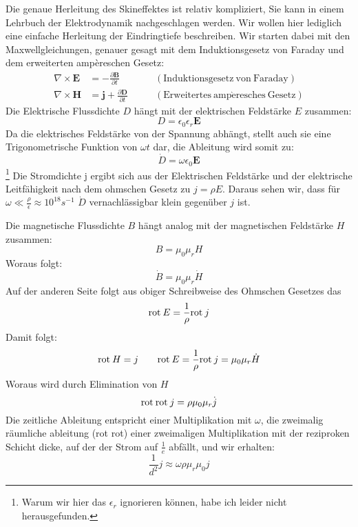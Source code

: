 Die genaue Herleitung des Skineffektes ist relativ kompliziert, Sie kann in einem Lehrbuch der Elektrodynamik nachgeschlagen werden. %
Wir wollen hier lediglich eine einfache Herleitung der Eindringtiefe beschreiben.
Wir starten dabei mit den Maxwellgleichungen, genauer gesagt mit dem Induktionsgesetz von Faraday und dem erweiterten ampèreschen Gesetz:
\begin{align}
\nabla \times \mathbf{E} &= -\frac{\partial \mathbf{B}}{\partial t} \qquad &\mathrm{(Induktionsgesetz\ von\ Faraday)} \\
\nabla \times \mathbf{H} &= \mathbf{j} + \frac{\partial \mathbf{D}}{\partial t} \qquad &\mathrm{(Erweitertes\ amp\grave{e}resches\ Gesetz)}
\end{align}
Die Elektrische Flussdichte $D$ hängt mit der elektrischen Feldstärke $E$ zusammen:
\begin{equation}
D = \epsilon_0 \epsilon_r \textbf{E}
\end{equation}
Da die elektrisches Feldstärke von der Spannung abhängt, stellt auch sie eine Trigonometrische Funktion von $\omega t$ dar, die Ableitung wird somit zu:
\begin{equation}
\dot{D} = \omega \epsilon_0 \textbf{E}
\end{equation}\footnote{Warum wir hier das $\epsilon_r$ ignorieren können, habe ich leider nicht herausgefunden.}
Die Stromdichte j ergibt sich aus der Elektrischen Feldstärke und der elektrische Leitfähigkeit nach dem ohmschen Gesetz zu $j = \rho E$. Daraus sehen wir, dass für $\omega \ll \frac{\rho}{\epsilon} \approx 10^18 s^{-1}$ $\dot D$ vernachlässigbar klein gegenüber $j$ ist.

Die magnetische Flussdichte $B$ hängt analog mit der magnetischen Feldstärke $H$ zusammen:
\begin{equation}
B = \mu_0 \mu_r H
\end{equation} 
Woraus folgt:
\begin{equation}
\dot{B} = \mu_0 \mu_r \dot{H}
\end{equation} 
Auf der anderen Seite folgt aus obiger Schreibweise des Ohmschen Gesetzes das 
\begin{equation}
\mathrm{rot\:} E = \frac{1}{\rho} \mathrm{rot\:} j
\end{equation}
Damit folgt:
\begin{equation}
\mathrm{rot\:} H = j \qquad
\mathrm{rot\:} E = \frac{1}{\rho} \mathrm{rot\:} j = \mu_0 \mu_r \dot{H}
\end{equation}
Woraus wird durch Elimination von $H$
\begin{equation}
\mathrm{rot\:}\mathrm{rot\:} j = \rho \mu_0 \mu_r \dot{j}
\end{equation}
Die zeitliche Ableitung entspricht einer Multiplikation mit $\omega$, die zweimalig räumliche ableitung (rot rot) einer zweimaligen Multiplikation mit der reziproken Schicht dicke, auf der der Strom auf $\frac{1}{e}$ abfällt, und wir erhalten:
\begin{equation}
\frac{1}{d^2} j \approx \omega \rho \mu_r \mu_0 j
\end{equation}

